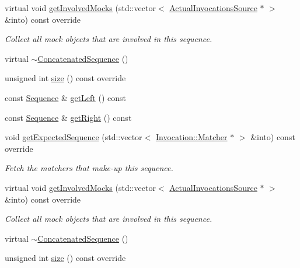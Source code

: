 \begin{DoxyCompactItemize}
virtual void \mbox{\hyperlink{classfakeit_1_1ConcatenatedSequence_a3b475e68ab4f750f2d4946e4777ebe30}{get\+Involved\+Mocks}} (std\+::vector$<$ \mbox{\hyperlink{structfakeit_1_1ActualInvocationsSource}{Actual\+Invocations\+Source}} $\ast$ $>$ \&into) const override
\begin{DoxyCompactList}\small\item\em Collect all mock objects that are involved in this sequence. \end{DoxyCompactList}\item 
virtual \mbox{\hyperlink{classfakeit_1_1ConcatenatedSequence_a22346ae8c3c2af91f26144338750be25}{$\sim$\+Concatenated\+Sequence}} ()
\item 
unsigned int \mbox{\hyperlink{classfakeit_1_1ConcatenatedSequence_aa1dba1b0274b30626ceab3a743c8105a}{size}} () const override
\item 
const \mbox{\hyperlink{classfakeit_1_1Sequence}{Sequence}} \& \mbox{\hyperlink{classfakeit_1_1ConcatenatedSequence_aee102fbcc892783441a36082e1a22789}{get\+Left}} () const
\item 
const \mbox{\hyperlink{classfakeit_1_1Sequence}{Sequence}} \& \mbox{\hyperlink{classfakeit_1_1ConcatenatedSequence_a7b1ed9161c972e43fdf2e4cfecbe5bd7}{get\+Right}} () const
\item 
void \mbox{\hyperlink{classfakeit_1_1ConcatenatedSequence_a176b1d4dac2e552f646c2c3ce98f0d1f}{get\+Expected\+Sequence}} (std\+::vector$<$ \mbox{\hyperlink{structfakeit_1_1Invocation_1_1Matcher}{Invocation\+::\+Matcher}} $\ast$ $>$ \&into) const override
\begin{DoxyCompactList}\small\item\em Fetch the matchers that make-\/up this sequence. \end{DoxyCompactList}\item 
virtual void \mbox{\hyperlink{classfakeit_1_1ConcatenatedSequence_a3b475e68ab4f750f2d4946e4777ebe30}{get\+Involved\+Mocks}} (std\+::vector$<$ \mbox{\hyperlink{structfakeit_1_1ActualInvocationsSource}{Actual\+Invocations\+Source}} $\ast$ $>$ \&into) const override
\begin{DoxyCompactList}\small\item\em Collect all mock objects that are involved in this sequence. \end{DoxyCompactList}\item 
virtual \mbox{\hyperlink{classfakeit_1_1ConcatenatedSequence_a22346ae8c3c2af91f26144338750be25}{$\sim$\+Concatenated\+Sequence}} ()
\item 
unsigned int \mbox{\hyperlink{classfakeit_1_1ConcatenatedSequence_aa1dba1b0274b30626ceab3a743c8105a}{size}} () const override

\end{DoxyCompactItemize}
